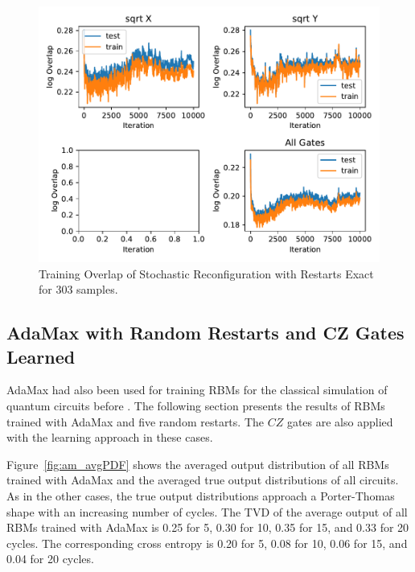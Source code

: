 \begin{figure}[H]
  \centering
  \includegraphics[width=\textwidth]{figures/results/SR-restarts-not-learned/avgOverlap_303.pdf}
  \caption[Training Overlap of Stochastic Reconfiguration with Restarts Exact]{Training 
  Overlap of Stochastic Reconfiguration with Restarts Exact for 303 samples.}
  \label{fig:sr_exact_overlap_303}
\end{figure}

\newpage

\subsection{AdaMax with Random Restarts and CZ Gates Learned}

AdaMax had also been used for training RBMs for the 
classical simulation of quantum circuits before \cite{jnsson2018neuralnetwork}. The following section presents the results
of RBMs trained with AdaMax and five random restarts. The $CZ$ gates are also applied with the 
learning approach in these cases.

Figure~\ref{fig:am_avgPDF} shows the averaged output distribution of all RBMs trained with AdaMax and 
the averaged true output distributions of all circuits. As in the other cases, the 
true output distributions approach a Porter-Thomas shape with an increasing number of cycles.
The TVD of the average output of all RBMs trained with AdaMax
is 0.25 for 5, 0.30 for 10, 0.35 for 15, and 0.33 for 20 cycles. The corresponding cross entropy is 
0.20 for 5, 0.08 for 10, 0.06 for 15, and 0.04 for 20 cycles.

